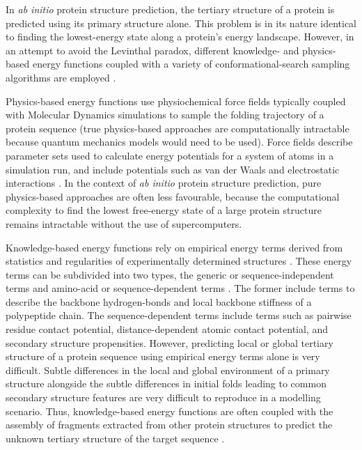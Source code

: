In \textit{ab initio} protein structure prediction, the tertiary structure of a protein is predicted using its primary structure alone. This problem is in its nature identical to finding the lowest-energy state along a protein's energy landscape. However, in an attempt to avoid the Levinthal paradox, different knowledge- and physics-based energy functions coupled with a variety of conformational-search sampling algorithms are employed \cite{Lee2017-oc}. 

Physics-based energy functions use physiochemical force fields typically coupled with Molecular Dynamics simulations to sample the folding trajectory of a protein sequence (true physics-based approaches are computationally intractable because quantum mechanics models would need to be used). Force fields describe parameter sets used to calculate energy potentials for a system of atoms in a simulation run, and include potentials such as van der Waals and electrostatic interactions \cite{Lee2017-oc}. In the context of \textit{ab initio} protein structure prediction, pure physics-based approaches are often less favourable, because the computational complexity to find the lowest free-energy state of a large protein structure remains intractable without the use of supercomputers.

Knowledge-based energy functions rely on empirical energy terms derived from statistics and regularities of experimentally determined structures \cite{Lee2017-oc}. These energy terms can be subdivided into two types, the generic or sequence-independent terms and amino-acid or sequence-dependent terms \cite{Skolnick2006-uv}. The former include terms to describe the backbone hydrogen-bonds and local backbone stiffness of a polypeptide chain. The sequence-dependent terms include terms such as pairwise residue contact potential, distance-dependent atomic contact potential, and secondary structure propensities. However, predicting local or global tertiary structure of a protein sequence using empirical energy terms alone is very difficult. Subtle differences in the local and global environment of a primary structure alongside the subtle differences in initial folds leading to common secondary structure features are very difficult to reproduce in a modelling scenario. Thus, knowledge-based energy functions are often coupled with the assembly of fragments extracted from other protein structures to predict the unknown tertiary structure of the target sequence \cite{Lee2017-oc}. 

